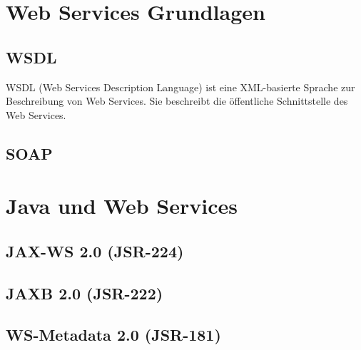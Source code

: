 \documentclass[runningheads]{llncs}
\begin{document}
  \section{Web Services Grundlagen}

  \subsection{WSDL}
  \nocite{wk_wsdl}
    WSDL (Web Services Description Language) ist eine XML-basierte Sprache zur Beschreibung von Web Services. Sie beschreibt die öffentliche Schnittstelle des Web Services.

  \subsection{SOAP}
  \nocite{wk_soap}

  \section{Java und Web Services}

  \subsection{JAX-WS 2.0 (JSR-224)}

  \subsection{JAXB 2.0 (JSR-222)}

  \subsection{WS-Metadata 2.0 (JSR-181)}

  \newpage
  
  
\end{document}
